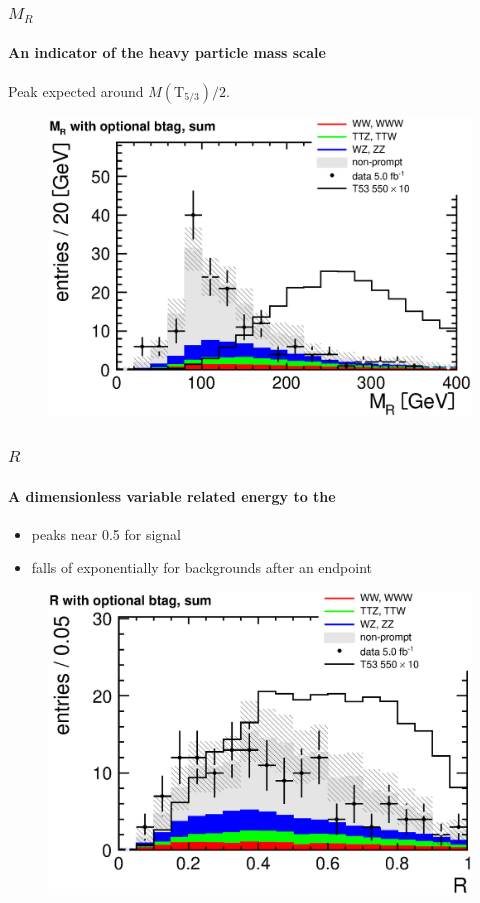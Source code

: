 \documentclass[ukenglish]{beamer}
\begin{document}
\begin{frame}
    \frametitle{$M_R$}
    \framesubtitle{An indicator of the heavy particle mass scale}
    \begin{block}{}
        Peak expected around $M(\mathrm{T}_{5/3})/2$.
    \end{block}
        \begin{figure}[h]
            \centering
            \includegraphics[width=.7\textwidth]{mr_optional_btag_sum.eps}
        \end{figure}
\end{frame}

\begin{frame}
    \frametitle{$R$}
    \framesubtitle{A dimensionless variable related energy to the \met}
    \begin{itemize}
        \item peaks near 0.5 for signal
        \item falls of exponentially for backgrounds after an endpoint
    \end{itemize}
        \begin{figure}[h]
            \centering
            \includegraphics[width=.7\textwidth]{r_optional_btag_sum.eps}
        \end{figure}
\end{frame}
\end{document}
